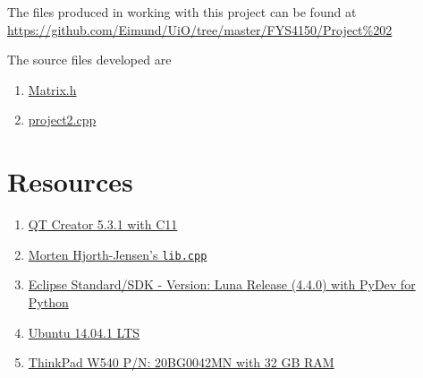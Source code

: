 \documentclass[11pt,english,a4paper]{article}
\begin{document}
\begin{flushleft}
The files produced in working with this project can be found at \href{https://github.com/Eimund/UiO/tree/master/FYS4150/Project\%202}{https://github.com/Eimund/UiO/tree/master/FYS4150/Project\%202} \linebreak

The source files developed are

\begin{enumerate}
\item{\href{https://github.com/Eimund/UiO/blob/master/FYS4150/Project\%202/project2/Matrix.h}{Matrix.h}}
\item{\href{https://github.com/Eimund/UiO/blob/master/FYS4150/Project\%202/project2/project2.cpp}{project2.cpp}}
\end{enumerate}

\newpage

\section{Resources}

\begin{enumerate}
\item{\href{http://qt-project.org/downloads}{QT Creator 5.3.1 with C11}}
\item{\href{http://www.uio.no/studier/emner/matnat/fys/FYS3150/h14/undervisningsmateriale/Programs\%20\%20(as\%20tar.gz\%20file,\%20all\%20languages)/programs.tar.gz}{Morten Hjorth-Jensen's \texttt{lib.cpp}}}
\item{\href{https://www.eclipse.org/downloads/}{Eclipse Standard/SDK  - Version: Luna Release (4.4.0) with PyDev for Python}}
\item{\href{http://www.ubuntu.com/download/desktop}{Ubuntu 14.04.1 LTS}}
\item{\href{http://shop.lenovo.com/no/en/laptops/thinkpad/w-series/w540/#tab-reseller}{ThinkPad W540 P/N: 20BG0042MN with 32 GB RAM}}
\end{enumerate}


\end{flushleft}
\end{document}
